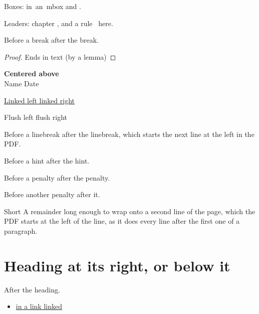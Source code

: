 \documentclass{article}
\begin{document}
Boxes: \mbox{in \hfill an mbox} and .

Leaders: chapter , and a rule \hrulefill\ here.

Before a break \hfill\break after the break.

\begin{proof}
Ends in text \hfill (by a lemma)
\end{proof}

\begin{center}
    \textbf{Centered above}\\
    Name \hfill Date
\end{center}

\begin{center}
    \href{https://example.com}{Linked left \hfill linked right}
\end{center}

\begin{flushright}
    Flush left \hfill flush right
\end{flushright}

Before a linebreak \hfill\linebreak after the linebreak, which starts the
next line at the left in the PDF.

Before a hint \hfill\linebreak[2] after the hint.

Before a penalty \hfill{} after the penalty.

\let\otherpenalty\penalty
Before another penalty \hfill\otherpenalty-10000 after it.

Short \hfill A remainder long enough to wrap onto a second line of the page,
which the PDF starts at the left of the line, as it does every line after the
first one of a paragraph.

\section{Heading \hfill at its right, or below it}
After the heading.

\begin{itemize}
    \item \href{https://example.com}{in a link \hfill linked}
\end{itemize}

\tableofcontents
\end{document}

